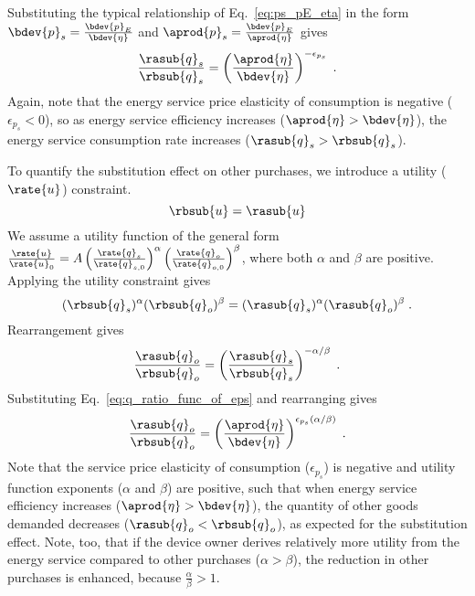 Substituting the typical relationship of Eq.~\ref{eq:ps_pE_eta} in the form
$\bdev{p}_s = \frac{\bdev{p}_E}{\bdev{\eta}}$ and
$\aprod{p}_s = \frac{\bdev{p}_E}{\aprod{\eta}}$
gives 
%
\begin{equation} \label{eq:q_ratio_func_of_eps}
  \frac{\rasub{q}_s}{\rbsub{q}_s} = \left( \frac{\aprod{\eta}}{\bdev{\eta}} \right)^{-\epsilon_{p_s}} \; .
\end{equation}
%
Again, note that the energy service price elasticity of consumption
is negative ($\epsilon_{p_s} < 0$), so
as energy service efficiency increases ($\aprod{\eta} > \bdev{\eta}$),
the energy service consumption rate increases ($\rasub{q}_s > \rbsub{q}_s$).

To quantify the substitution effect on other purchases,
we introduce a utility ($\rate{u}$) constraint.
%
\begin{equation}
  \rbsub{u} = \rasub{u}
\end{equation}
%
We assume a utility function of the general form
$\frac{\rate{u}}{\rate{u}_0} 
      = A \left( \frac{\rate{q}_s}{\rate{q}_{s,0}} \right)^\alpha \left( \frac{\rate{q}_o}{\rate{q}_{o,0}} \right)^\beta$,
where both $\alpha$ and $\beta$ are positive.
Applying the utility constraint gives
%
\begin{equation}
  (\rbsub{q}_s)^\alpha (\rbsub{q}_o)^\beta = (\rasub{q}_s)^\alpha (\rasub{q}_o)^\beta \; .
\end{equation}
%
Rearrangement gives
%
\begin{equation}
  \frac{\rasub{q}_o}{\rbsub{q}_o} = \left( \frac{\rasub{q}_s}{\rbsub{q}_s} \right) ^ {- \alpha / \beta} \; .
\end{equation}
%
Substituting Eq.~\ref{eq:q_ratio_func_of_eps} and rearranging gives
%
\begin{equation} \label{eq:qohat_qostar}
  \frac{\rasub{q}_o}{\rbsub{q}_o} = \left( \frac{\aprod{\eta}}{\bdev{\eta}}\right) ^ {\epsilon_{p_s} (\alpha / \beta)} \; .
\end{equation}
%
Note that the service price elasticity of consumption ($\epsilon_{p_s}$)
is negative and utility function exponents ($\alpha$ and $\beta$) are positive, such that
when energy service efficiency increases ($\aprod{\eta} > \bdev{\eta}$),
the quantity of other goods demanded decreases ($\rasub{q}_o < \rbsub{q}_o$),
as expected for the substitution effect.
Note, too, that if the device owner derives relatively more utility 
from the energy service compared to other purchases ($\alpha > \beta$), 
the reduction in other purchases is enhanced, because $\frac{\alpha}{\beta} > 1$.

